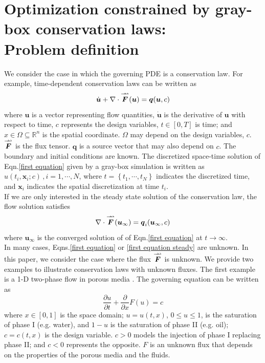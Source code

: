 \documentclass{paper1}
\newcommand{\doublerightharpoonup}{%
  \rightharpoonup\mkern-10mu\rightharpoonup%
}
\begin{document}
\section {Optimization constrained by gray-box conservation laws: \\Problem definition}
\label{prototypes}

We consider the case in which the governing PDE is a conservation law.
For example, time-dependent conservation laws can be written as
\begin{equation}
    \dot{\boldsymbol{u}} + \nabla \cdot \overset{\doublerightharpoonup}{\boldsymbol{F}}
    (\boldsymbol{u})
    = \boldsymbol{q}(\boldsymbol{u},c)
    \label{first equation}
\end{equation}
where $\boldsymbol{u}$ is a vector representing flow quantities,
$\dot{\boldsymbol{u}}$ is the derivative of $\boldsymbol{u}$ with respect to time,
$c$ represents the design variables,
$t\in[0,T]$ is time;
and $x\in \Omega \subseteq \mathbb{R}^{n}$ is the spatial coordinate.
$\Omega$ may depend on the design variables, $c$.
$\overset{\doublerightharpoonup}{\boldsymbol{F}}$ is the flux tensor.
$\boldsymbol{q}$ is a source vector that may also depend on $c$.
The boundary and initial conditions are known.
The discretized space-time solution of Eqn.\eqref{first equation} given by a gray-box simulation
is written as $\hat{u}(t_i, \mathbf{x}_i; c)\,, i=1,\cdots,N$, where
$t=\left\{t_1,\cdots, t_N\right\}$ indicates the discretized time, and 
$\mathbf{x}_i$ indicates the spatial discretization at time $t_i$.\\

If we are only interested in the steady state solution of the conservation law, the flow solution satisfies
\begin{equation}
    \nabla \cdot 
    \overset{\doublerightharpoonup}{\boldsymbol{F}}(\boldsymbol{u}_{\infty}) 
    = \boldsymbol{q}_i(\boldsymbol{u}_{\infty},c)
    \label{first equation steady}
\end{equation}
where $\boldsymbol{u}_{\infty}$ is the converged solution of 
of Eqn.\eqref{first equation} at $t\rightarrow \infty$.\\

In many cases, Eqns.\eqref{first equation} or \eqref{first equation steady} are unknown. 
In this paper,
we consider the case where the flux $\overset{\doublerightharpoonup}{\boldsymbol{F}}$ is unknown. 
We provide two examples to illustrate conservation laws with unknown fluxes. 
The first example is a 1-D two-phase flow in porous media \cite{Buckley Leverett}. 
The governing equation can be written as
\begin{equation}
    \frac{\partial u}{\partial t} + \frac{\partial }{\partial x} F(u) = c
\end{equation}
where $x\in[0,1]$ is the space domain;
$u = u(t,x)$, $0\le u\le 1$, is the saturation of phase I (e.g. water), 
and $1-u$ is the saturation of phase II (e.g. oil);
$c=c(t,x)$ is the design variable. $c>0$ models the injection of phase I replacing phase II; and $c<0$
represents the opposite.
$F$ is an unknown flux that depends on the properties of the porous media and the fluids.\\
\end{document}
